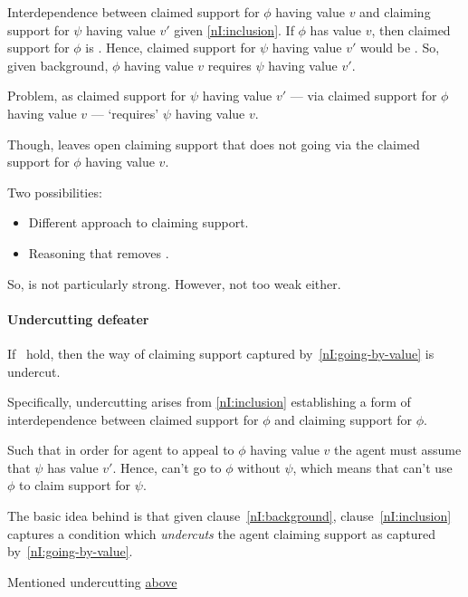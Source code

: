 \begin{note}
  Interdependence between claimed support for \(\phi\) having value \(v\) and claiming support for \(\psi\) having value \(v'\) given \ref{nI:inclusion}.
  If \(\phi\) has value \(v\), then claimed support for \(\phi\) is \nmom{}.
  Hence, claimed support for \(\psi\) having value \(v'\) would be \nmom{}.
  So, given background, \(\phi\) having value \(v\) requires \(\psi\) having value \(v'\).

  Problem, as claimed support for \(\psi\) having value \(v'\) --- via claimed support for \(\phi\) having value \(v\) --- `requires' \(\psi\) having value \(v\).

  Though, leaves open claiming support that does not going via the claimed support for \(\phi\) having value \(v\).

  Two possibilities:
  \begin{itemize}
  \item Different approach to claiming support.
  \item Reasoning that removes \expec{}.
  \end{itemize}

  So, \nI{} is not particularly strong.
  However, not too weak either.
\end{note}



\paragraph{Undercutting defeater}

  {\color{green}
    If~\nIBackground{} hold, then the way of claiming support captured by~\ref{nI:going-by-value} is undercut.

    Specifically, undercutting arises from \ref{nI:inclusion} establishing a form of interdependence between claimed support for \(\phi\) and claiming support for \(\phi\).

    Such that in order for agent to appeal to \(\phi\) having value \(v\) the agent must assume that \(\psi\) has value \(v'\).
    Hence, can't go to \(\phi\) without \(\psi\), which means that can't use \(\phi\) to claim support for \(\psi\).
  }

\begin{note}
  The basic idea behind \nI{} is that given clause~\ref{nI:background}, clause~\ref{nI:inclusion} captures a condition which \emph{undercuts} the agent claiming support as captured by~\ref{nI:going-by-value}.

  Mentioned undercutting {\color{red} \hyperref[first-mention-undercutting-defeater]{above}}
\end{note}

